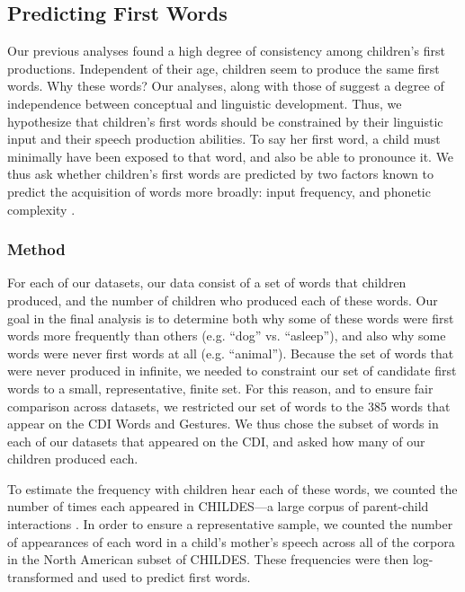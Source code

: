 \documentclass[10pt,letterpaper]{article}
\begin{document}
\subsection{Predicting First Words}

Our previous analyses found a high degree of consistency among children's first productions. Independent of their age, children seem to produce the same first words. Why these words? Our analyses, along with those of  suggest a degree of independence between conceptual and linguistic development. Thus, we hypothesize that children's first words should be constrained by their linguistic input and their speech production abilities. To say her first word, a child must minimally have been exposed to that word, and also be able to pronounce it. We thus ask whether children's first words are predicted by two factors known to predict the acquisition of words more broadly: input frequency, and phonetic complexity \cite{morgan1996,goodman2008}.

\subsubsection{Method}

For each of our datasets, our data consist of a set of words that children produced, and the number of children who produced each of these words. Our goal in the final analysis is to determine both why some of these words were first words more frequently than others (e.g. ``dog'' vs. ``asleep''), and also why some words were never first words at all (e.g. ``animal''). Because the set of words that were never produced in infinite, we needed to constraint our set of candidate first words to a small, representative, finite set. For this reason, and to ensure fair comparison across datasets, we restricted our set of words to the 385 words that appear on the CDI Words and Gestures. We thus chose the subset of words in each of our datasets that appeared on the CDI, and asked how many of our children produced each.

To estimate the frequency with children hear each of these words, we counted the number of times each appeared in CHILDES---a large corpus of parent-child interactions \cite{macwhinney2000}. In order to ensure a representative sample, we counted the number of appearances of each word in a child's mother's speech across all of the corpora in the North American subset of CHILDES. These frequencies were then log-transformed and used to predict first words.
\end{document}
